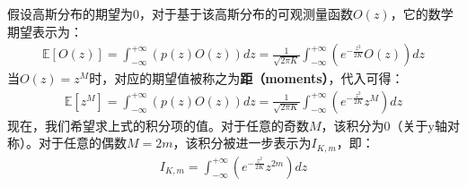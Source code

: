 假设高斯分布的期望为$0$，对于基于该高斯分布的可观测量函数$O(z)$，它的数学期望表示为：
\begin{equation}
    \begin{split}
    \mathbb{E}[O(z)] = \int_{-\infty}^{+\infty} 
    \left(
        p(z) O(z)
    \right) dz 
    = \frac{1}{\sqrt{2\pi K}} \int_{-\infty}^{+\infty} 
    \left(
        e^{-\frac{z^2}{2K}} O(z)
    \right) dz
    \end{split}
\end{equation}
当$O(z)=z^M$时，对应的期望值被称之为\textbf{距（moments）}，代入可得：
\begin{equation}
    \begin{split}
    \label{eq:1.12}
    \mathbb{E}[z^M] = \int_{-\infty}^{+\infty} 
    \left(
        p(z) O(z)
    \right) dz 
    = \frac{1}{\sqrt{2\pi K}} \int_{-\infty}^{+\infty} 
    \left(
        e^{-\frac{z^2}{2K}} z^M
    \right) dz
    \end{split}
\end{equation}
现在，我们希望求上式的积分项的值。对于任意的奇数$M$，该积分为$0$（关于y轴对称）。对于任意的偶数$M=2m$，该积分被进一步表示为$I_{K,m}$，即：
\begin{equation}
    \begin{split}
    I_{K,m} 
    = \int_{-\infty}^{+\infty} 
    \left(
        e^{-\frac{z^2}{2K}} z^{2m}
    \right) dz
    \end{split}
\end{equation}

